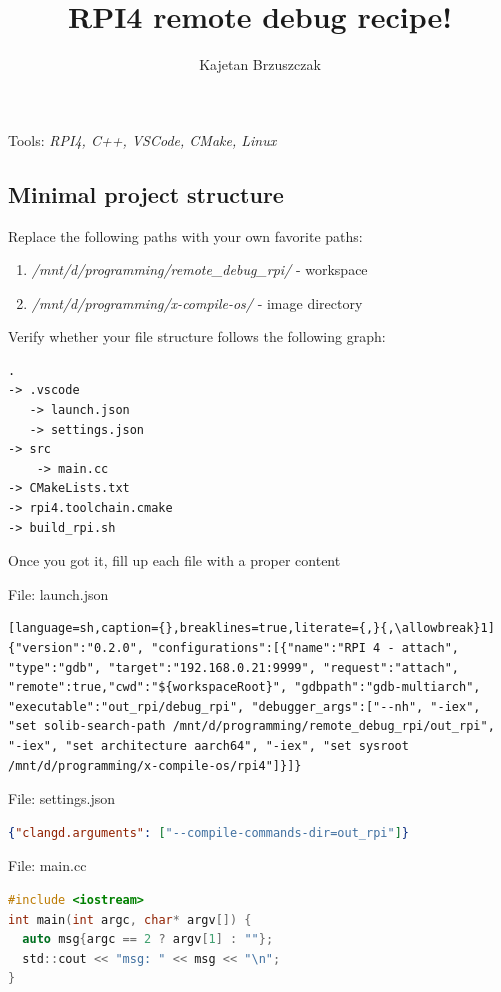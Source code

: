 \documentclass[twocolumn, 10pt]{article}
\title{RPI4 remote debug recipe!}
\author{Kajetan Brzuszczak}
\makeatletter
\renewcommand{\maketitle}{
\begin{flushleft}
{\noindent\Huge\bf\@title}\break
\end{flushleft}
}
\makeatother
\begin{document}
\maketitle

Tools: \textit{RPI4, C++, VSCode, CMake, Linux}

\subsection*{Minimal project structure}
Replace the following paths with your own favorite paths:
\small
\begin{enumerate}
  \item \textit{/mnt/d/programming/remote\_debug\_rpi/} - workspace
  \item \textit{/mnt/d/programming/x-compile-os/} - image directory
\end{enumerate}

\small

Verify whether your file structure follows the following graph:
\begin{lstlisting}[language=txt,backgroundcolor=\color{gray!10},caption={}]
.
-> .vscode
   -> launch.json
   -> settings.json
-> src
    -> main.cc
-> CMakeLists.txt
-> rpi4.toolchain.cmake
-> build_rpi.sh
\end{lstlisting}

Once you got it, fill up each file with a proper content

\tiny{}File: launch.json\small{}
\begin{lstlisting}[language=sh,caption={},breaklines=true,literate={,}{,\allowbreak}1]
{"version":"0.2.0", "configurations":[{"name":"RPI 4 - attach", "type":"gdb", "target":"192.168.0.21:9999", "request":"attach", "remote":true,"cwd":"${workspaceRoot}", "gdbpath":"gdb-multiarch", "executable":"out_rpi/debug_rpi", "debugger_args":["--nh", "-iex", "set solib-search-path /mnt/d/programming/remote_debug_rpi/out_rpi", "-iex", "set architecture aarch64", "-iex", "set sysroot /mnt/d/programming/x-compile-os/rpi4"]}]}
\end{lstlisting}

\tiny{}File: settings.json\small{}
\begin{lstlisting}[language=json,breaklines=true,caption={}]
{"clangd.arguments": ["--compile-commands-dir=out_rpi"]}
\end{lstlisting}

\tiny{}File: main.cc\small{}
\begin{lstlisting}[language=c,caption={}]
#include <iostream>
int main(int argc, char* argv[]) {
  auto msg{argc == 2 ? argv[1] : ""};
  std::cout << "msg: " << msg << "\n";
}
\end{lstlisting}
\end{document}
